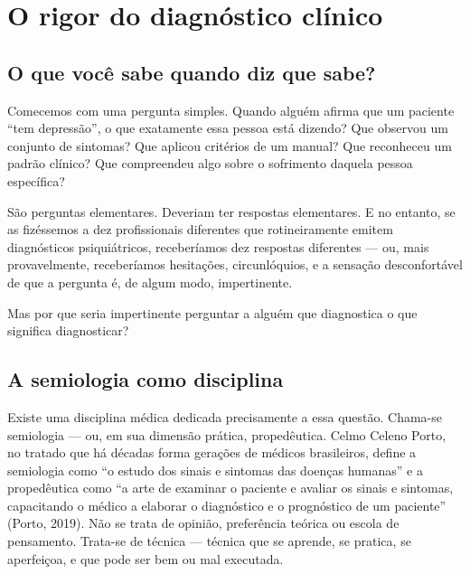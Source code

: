 \chapter{O rigor do diagnóstico clínico}
\label{ch:diagnostico}

\section{O que você sabe quando diz que sabe?}
\label{sec:o-que-sabe}

Comecemos com uma pergunta simples. Quando alguém afirma que um paciente \enquote{tem depressão}, o que exatamente essa pessoa está dizendo? Que observou um conjunto de sintomas? Que aplicou critérios de um manual? Que reconheceu um padrão clínico? Que compreendeu algo sobre o sofrimento daquela pessoa específica?

São perguntas elementares. Deveriam ter respostas elementares. E no entanto, se as fizéssemos a dez profissionais diferentes que rotineiramente emitem diagnósticos psiquiátricos, receberíamos dez respostas diferentes --- ou, mais provavelmente, receberíamos hesitações, circunlóquios, e a sensação desconfortável de que a pergunta é, de algum modo, impertinente.

Mas por que seria impertinente perguntar a alguém que diagnostica o que significa diagnosticar?

\section{A semiologia como disciplina}
\label{sec:semiologia}

Existe uma disciplina médica dedicada precisamente a essa questão. Chama-se semiologia --- ou, em sua dimensão prática, propedêutica. Celmo Celeno Porto, no tratado que há décadas forma gerações de médicos brasileiros, define a semiologia como \enquote{o estudo dos sinais e sintomas das doenças humanas} e a propedêutica como \enquote{a arte de examinar o paciente e avaliar os sinais e sintomas, capacitando o médico a elaborar o diagnóstico e o prognóstico de um paciente} (Porto, 2019). Não se trata de opinião, preferência teórica ou escola de pensamento. Trata-se de técnica --- técnica que se aprende, se pratica, se aperfeiçoa, e que pode ser bem ou mal executada.

